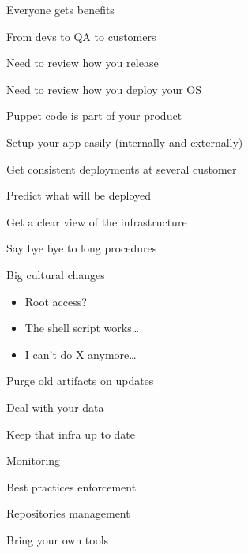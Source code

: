 \begin{iframe}
\item Everyone gets benefits
\item From devs to QA to customers
\item Need to review how you release
\item Need to review how you deploy your OS
\item Puppet code is part of your product
\end{iframe}
\begin{iframe}[Advantages]
\item Setup your app easily (internally and externally)
\item Get consistent deployments at several customer
\item Predict what will be deployed
\item Get a clear view of the infrastructure
\item Say bye bye to long procedures
\end{iframe}
\begin{iframe}
\item Big cultural changes
    \begin{itemize}
        \item Root access?
        \item The shell script works\dots
        \item I can't do X anymore\dots
    \end{itemize}
\item Purge old artifacts on updates
\item Deal with your data
\item Keep that infra up to date
\end{iframe}

\begin{iframe}
\item Monitoring
\item Best practices enforcement
\item Repositories management
\item Bring your own tools
\end{iframe}

\thankyouSlide
\renewcommand{\insertLogo}{}
\contactSlide
